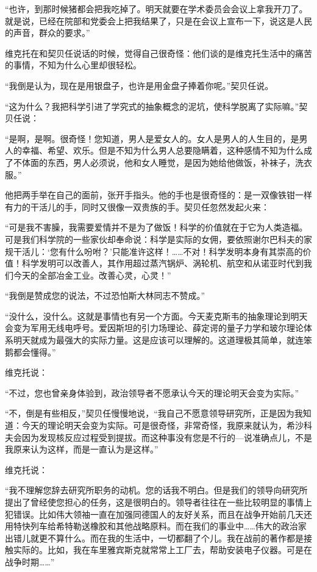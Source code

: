 “也许，到那时候猪都会把我吃掉了。明天就要在学术委员会会议上拿我开刀了。就是说，已经在院部和党委会上把我结果了，只是在会议上宣布一下，说这是人民的声音，群众的要求。”

维克托在和契贝任说话的时候，觉得自己很奇怪：他们谈的是维克托生活中的痛苦的事情，不知为什么心里却很轻松。

“我倒是认为，现在是用银盘子，也许是用金盘子捧着你呢。”契贝任说。

“这为什么？我把科学引进了学究式的抽象概念的泥坑，使科学脱离了实际嘛。”契贝任说：

“是啊，是啊。很奇怪！您知道，男人是爱女人的。女人是男人的人生目的，是男人的幸福、希望、欢乐。但是不知为什么男人总要隐瞒着，这种感情不知为什么成了不体面的东西，男人必须说，他和女人睡觉，是因为她给他做饭，补袜子，洗衣服。”

他把两手举在自己的面前，张开手指头。他的手也是很奇怪的：是一双像铁钳一样有力的干活儿的手，同时又很像一双贵族的手。契贝任忽然发起火来：

“可是我不害臊，我需要爱情并不是为了做饭！科学的价值就在于它为人类造福。可是我们科学院的一些家伙却奉命说：科学是实际的女佣，要依照谢尔巴科夫的家规干活儿：‘您有什么吩咐？’只能准许这样！……不对！科学发明本身有其崇高的价值！科学发明可以改善人，其作用超过蒸汽锅炉、涡轮机、航空和从诺亚时代到我们今天的全部冶金工业。改善心灵，心灵！”

“我倒是赞成您的说法，不过恐怕斯大林同志不赞成。”

“没什么，没什么。这就是事情也有另一个方面。今天麦克斯韦的抽象理论到明天会变为军用无线电呼号。爱因斯坦的引力场理论、薛定谔的量子力学和玻尔理论体系明天就成为最强大的实际力量。这是应该可以理解的。这道理极其简单，就连笨鹅都会懂得。”

维克托说：

“不过，您也曾亲身体验到，政治领导者不愿承认今天的理论明天会变为实际。”

“不，倒是有些相反，”契贝任慢慢地说，“我自己不愿意领导研究所，正是因为我知道：今天的理论明天会变为实际。可是很奇怪，非常奇怪，我原来就认为，希沙科夫会因为发现核反应过程受到提拔。而这种事没有您是不行的—说准确点儿，不是我原来认为这样，而是一直认为是这样。”

维克托说：

“我不理解您辞去研究所职务的动机。您的话我不明白。但是我们的领导向研究所提出了曾经使您担心的任务，这是很明白的。领导者往往在一些比较明显的事情上犯错误。比如伟大领袖一直在加强同德国人的友好关系，而且在战争开始前几天还用特快列车给希特勒送橡胶和其他战略原料。而在我们的事业中……伟大的政治家出错儿就更不算什么。而在我的生活中，一切都翻了个儿。我在战前的著作都是接触实际的。比如，我在车里雅宾斯克就常常上工厂去，帮助安装电子仪器。可是在战争时期……”

